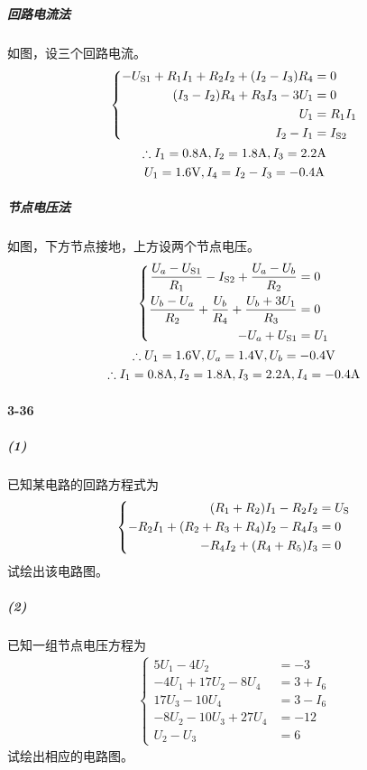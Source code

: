 \documentclass[hyperref, UTF8]{ctexart}
\newcommand{\volt}{{\rm V}}
\newcommand{\source}{{\rm S}}
\newcommand{\ampere}{{\rm A}}
\begin{document}
\subparagraph{回路电流法}如图，设三个回路电流。
\begin{gather*}
    \left\{ \begin{aligned}
    -U_{\source 1}+R_1I_1+R_2I_2+(I_2-I_3)R_4 &= 0 \\
    (I_3-I_2)R_4+R_3I_3-3U_1 &= 0 \\
    U_1 &= R_1I_1 \\
    I_2 - I_1 &= I_{\source 2}
    \end{aligned} \right. \\
    \therefore I_1=0.8\ampere, I_2=1.8\ampere, I_3=2.2\ampere\\
     U_1=1.6\volt, I_4=I_2-I_3=-0.4\ampere
\end{gather*}
\subparagraph{节点电压法}如图，下方节点接地，上方设两个节点电压。
\begin{gather*}
    \left\{ \begin{aligned}
    \frac{U_a-U_{\source 1}}{R_1} - I_{\source 2} + \frac{U_a-U_b}{R_2} &= 0 \\
    \frac{U_b-U_a}{R_2} + \frac{U_b}{R_4} + \frac{U_b+3U_1}{R_3} & = 0 \\
    -U_a+U_{\source 1} &= U_1
    \end{aligned} \right. \\
    \therefore U_1=1.6\volt, U_a=1.4\volt, U_b=-0.4\volt \\
    \therefore I_1=0.8\ampere, I_2=1.8\ampere, I_3=2.2\ampere, I_4=-0.4\ampere
\end{gather*}

\paragraph{3-36}\label{3-36}
\subparagraph{(1)}
已知某电路的回路方程式为
\begin{gather*}
    \left\{ \begin{aligned}
    (R_1+R_2)I_1-R_2I_2 &= U_\source \\
    -R_2I_1+(R_2+R_3+R_4)I_2-R_4I_3 &= 0 \\
    -R_4I_2+(R_4+R_5)I_3 &= 0
    \end{aligned} \right.
\end{gather*}
试绘出该电路图。
\subparagraph{(2)}已知一组节点电压方程为
\begin{gather*}
    \left\{ \begin{aligned}
    5U_1-4U_2 &= -3 \\
    -4U_1+17U_2-8U_4 &= 3+I_6 \\
    17U_3-10U_4 &= 3 - I_6 \\
    -8U_2-10U_3+27U_4 &= -12 \\
    U_2-U_3 &= 6
    \end{aligned} \right.
\end{gather*}
试绘出相应的电路图。
\end{document}
